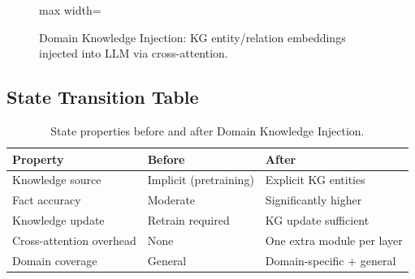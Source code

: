 \begin{figure}[h]
\centering
\begin{adjustbox}{max width=\linewidth}
\end{adjustbox}
\caption{Domain Knowledge Injection: KG entity/relation embeddings injected into LLM via cross-attention.}
\end{figure}

\subsection{State Transition Table}
\begin{table}[h]\centering
\begin{tabular}{lll}\toprule
\textbf{Property} & \textbf{Before} & \textbf{After}\\\midrule
Knowledge source & Implicit (pretraining) & Explicit KG entities\\
Fact accuracy & Moderate & Significantly higher\\
Knowledge update & Retrain required & KG update sufficient\\
Cross-attention overhead & None & One extra module per layer\\
Domain coverage & General & Domain-specific + general\\\bottomrule
\end{tabular}
\caption{State properties before and after Domain Knowledge Injection.}
\end{table}

